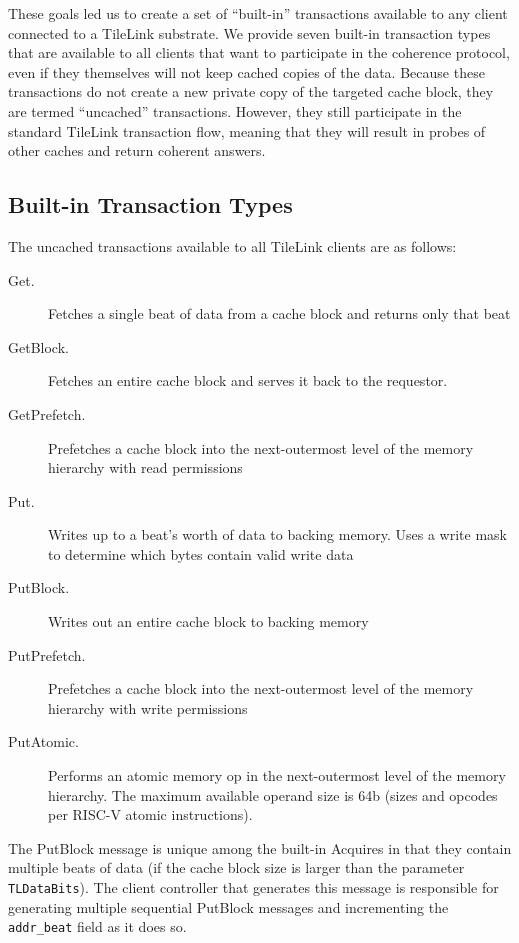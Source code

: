 These goals led us to create a set of ``built-in'' transactions available to any client connected to a TileLink substrate.
We provide seven built-in transaction types that are available to all clients that want to participate in the coherence protocol, even if they themselves will not keep cached copies of the data.
Because these transactions do not create a new private copy of the targeted cache block, they are termed ``uncached'' transactions. 
However, they still participate in the standard TileLink transaction flow, meaning that they will result in probes of other caches and return coherent answers.

\subsection{Built-in Transaction Types}

The uncached transactions available to all TileLink clients are as follows:
\begin{description}
\item[Get.] Fetches a single beat of data from a cache block and returns only that beat
\item[GetBlock.] Fetches an entire cache block and serves it back to the requestor.
\item[GetPrefetch.]  Prefetches a cache block into the next-outermost level of the memory hierarchy with read permissions
\item[Put.] Writes up to a beat's worth of data to backing memory. Uses a write mask to determine which bytes contain valid write data
\item[PutBlock.] Writes out an entire cache block to backing memory
\item[PutPrefetch.]  Prefetches a cache block into the next-outermost level of the memory hierarchy with write permissions
\item[PutAtomic.] Performs an atomic memory op in the next-outermost level of the memory hierarchy. The maximum available operand size is 64b (sizes and opcodes per RISC-V atomic instructions).
\end{description}

The PutBlock message is unique among the built-in Acquires in that they contain multiple beats of data (if the cache block size is larger than the parameter {\tt TLDataBits}).
The client controller that generates this message is responsible for generating multiple sequential PutBlock messages and incrementing the {\tt addr\_beat} field as it does so.

